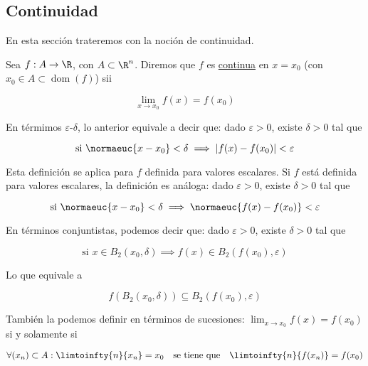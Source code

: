 \subsection{Continuidad}

En esta sección trateremos con la noción de continuidad.

\begin{defn}
    Sea $f: A \rightarrow \R$, con $A \subset \R^n$. Diremos que $f$ es \ul{continua} en $x = x_0$ (con $x_0 \in A \subset \operatorname{dom}(f)$) sii
    
    \[
    \lim_{x \to x_0} f(x) = f(x_0)
    \]
    
    En térmimos $\varepsilon$-$\delta$, lo anterior equivale a decir que: dado $\varepsilon > 0$, existe $\delta > 0$ tal que
    
    \[
    \text{si $\normaeuc{x - x_0} < \delta$} \implies |f(x) - f(x_0)| < \varepsilon
    \]
    
    Esta definición se aplica para $f$ definida para valores escalares. Si $f$ está definida para valores escalares, la definición es análoga: dado $\varepsilon > 0$, existe $\delta > 0$ tal que
    
    \[
    \text{si $\normaeuc{x - x_0} < \delta$} \implies \normaeuc{f(x) - f(x_0)} < \varepsilon
    \]
    
    En términos conjuntistas, podemos decir que: dado $\varepsilon > 0$, existe $\delta > 0$ tal que
    
    \[
    \text{si $x \in B_2(x_0, \delta)$} \implies f(x) \in B_2(f(x_0), \varepsilon)
    \]
    
    Lo que equivale a
    
    \[
    f\left( B_2(x_0, \delta) \right) \subseteq B_2\left( f(x_0), \varepsilon \right)
    \]
    
    También la podemos definir en términos de sucesiones: $\lim_{x \to x_0} f(x) = f(x_0)$ si y solamente si
    
    \[
    \forall (x_n) \subset A : \limtoinfty{n}{x_n} = x_0 \quad \text{se tiene que} \quad \limtoinfty{n}{f(x_n)} = f(x_0)
    \]
\end{defn}

